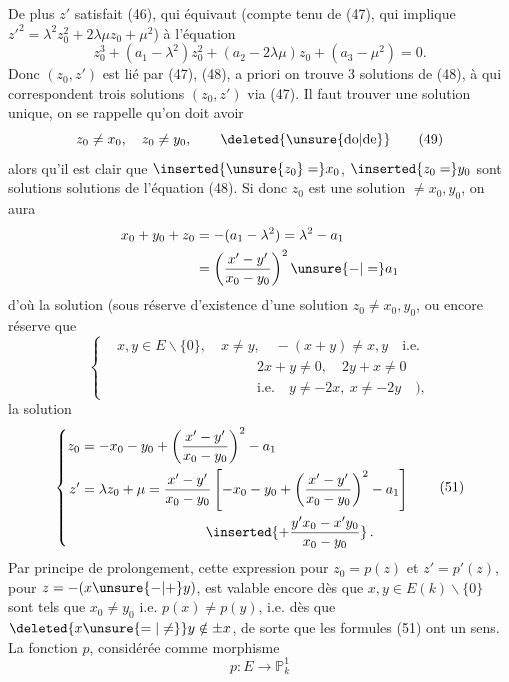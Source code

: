 De plus $z'$ satisfait (46), qui équivaut   (compte tenu de (47), qui implique $ {z'}^2=\lambda^2z_0^2+2\lambda\mu z_0+\mu^2$) à l'équation
\[
 z_0^3+(a_1-\lambda^2)z_0^2+(a_2-2\lambda\mu)z_0+(a_3-\mu^2)=0. \tag*{(48)}
\]
Donc $(z_0,z')$ est lié par (47), (48), a priori on trouve 3 solutions  de (48), à qui correspondent trois solutions $(z_0,z')$ via (47). Il faut trouver une solution unique, on se rappelle qu'on doit avoir
\[
 z_0\ne x_0,\quad z_0\ne y_0,\qquad\deleted{\text{\unsure{do|de}}} \tag*{(49)}
\]
alors qu'il est clair que $\inserted{\unsure{z_0}=}x_0$, $\inserted{z_0=}y_0$ sont solutions solutions de l'équation (48). Si donc $z_0$ est une solution $\ne x_0,y_0$, on aura
\[
 \begin{aligned}
 x_0+y_0+z_0&=-(a_1-\lambda^2)=\lambda^2-a_1\\
 &=\left(\frac{x'-y'}{x_0-y_0}\right)^2\unsure{-|=}a_1
 \end{aligned}
\]
d'où la solution (sous réserve d'existence d'une solution $z_0\ne x_0,y_0$, ou encore   réserve que
\[
 \left\{\begin{aligned}
 &x,y\in E\smallsetminus\{0\},\quad x\ne y,\quad -(x+y)\ne x,y\quad\text{i.e.}\\
 &\hspace{10em}2x+y\ne0,\quad 2y+x\ne0\\
 &\hspace{10em}\text{i.e.}\quad y\ne-2x,\ x\ne-2y\quad),
 \end{aligned}\right. \tag*{(50)}
\]
la solution
\[
 \left\{\begin{aligned}
 z_0&=-x_0-y_0+\left(\frac{x'-y'}{x_0-y_0}\right)^2-a_1\\
 z'&=\lambda z_0+\mu=\frac{x'-y'}{x_0-y_0}
 \left[-x_0-y_0+\left(\frac{x'-y'}{x_0-y_0}\right)^2-a_1\right]\\
 &\hspace{9em}\inserted{+\frac{y'x_0-x'y_0}{x_0-y_0}}\,.
 \end{aligned}\right. \tag*{(51)}
\]
Par principe de prolongement, cette expression pour $z_0=p(z)$ et $z'=p'(z)$, pour $z=-(x\unsure{-|+}y)$, est valable encore dès que $x,y\in E(k)\smallsetminus\{0\}$ sont tels que $x_0\ne y_0$ i.e. $p(x)\ne p(y)$, i.e. dès que $\deleted{x\unsure{=|\ne}}y\notin\pm x$, de sorte que les formules (51) ont un sens.
La fonction $p$, considérée comme morphisme
\[
p:E\longrightarrow\mathbb{P}^1_k\tag*{(52)}
\]
